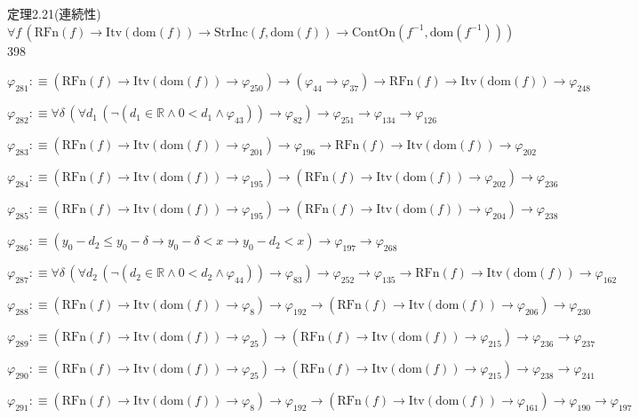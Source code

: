 \begin{fullproof}{定理2.21(連続性)}{$\forall f\,(\mathrm{RFn}(f) \to \mathrm{Itv}(\mathrm{dom}(f)) \to \mathrm{StrInc}(f,\mathrm{dom}(f)) \to \mathrm{ContOn}(f^{-1},\mathrm{dom}(f^{-1})))$}{398}
\begin{abbrevlist}
\item $\varphi_{281} :\equiv (\mathrm{RFn}(f) \to \mathrm{Itv}(\mathrm{dom}(f)) \to \varphi_{250}) \to (\varphi_{44} \to \varphi_{37}) \to \mathrm{RFn}(f) \to \mathrm{Itv}(\mathrm{dom}(f)) \to \varphi_{248}$
\item $\varphi_{282} :\equiv \forall \delta\,(\forall d_{1}\,(\neg (d_{1} \in \mathbb{R} \land 0 < d_{1} \land \varphi_{43})) \to \varphi_{82}) \to \varphi_{251} \to \varphi_{134} \to \varphi_{126}$
\item $\varphi_{283} :\equiv (\mathrm{RFn}(f) \to \mathrm{Itv}(\mathrm{dom}(f)) \to \varphi_{201}) \to \varphi_{196} \to \mathrm{RFn}(f) \to \mathrm{Itv}(\mathrm{dom}(f)) \to \varphi_{202}$
\item $\varphi_{284} :\equiv (\mathrm{RFn}(f) \to \mathrm{Itv}(\mathrm{dom}(f)) \to \varphi_{195}) \to (\mathrm{RFn}(f) \to \mathrm{Itv}(\mathrm{dom}(f)) \to \varphi_{202}) \to \varphi_{236}$
\item $\varphi_{285} :\equiv (\mathrm{RFn}(f) \to \mathrm{Itv}(\mathrm{dom}(f)) \to \varphi_{195}) \to (\mathrm{RFn}(f) \to \mathrm{Itv}(\mathrm{dom}(f)) \to \varphi_{204}) \to \varphi_{238}$
\item $\varphi_{286} :\equiv (y_{0} - d_{2} \leq y_{0} - \delta \to y_{0} - \delta < x \to y_{0} - d_{2} < x) \to \varphi_{197} \to \varphi_{268}$
\item $\varphi_{287} :\equiv \forall \delta\,(\forall d_{2}\,(\neg (d_{2} \in \mathbb{R} \land 0 < d_{2} \land \varphi_{44})) \to \varphi_{83}) \to \varphi_{252} \to \varphi_{135} \to \mathrm{RFn}(f) \to \mathrm{Itv}(\mathrm{dom}(f)) \to \varphi_{162}$
\item $\varphi_{288} :\equiv (\mathrm{RFn}(f) \to \mathrm{Itv}(\mathrm{dom}(f)) \to \varphi_{8}) \to \varphi_{192} \to (\mathrm{RFn}(f) \to \mathrm{Itv}(\mathrm{dom}(f)) \to \varphi_{206}) \to \varphi_{230}$
\item $\varphi_{289} :\equiv (\mathrm{RFn}(f) \to \mathrm{Itv}(\mathrm{dom}(f)) \to \varphi_{25}) \to (\mathrm{RFn}(f) \to \mathrm{Itv}(\mathrm{dom}(f)) \to \varphi_{215}) \to \varphi_{236} \to \varphi_{237}$
\item $\varphi_{290} :\equiv (\mathrm{RFn}(f) \to \mathrm{Itv}(\mathrm{dom}(f)) \to \varphi_{25}) \to (\mathrm{RFn}(f) \to \mathrm{Itv}(\mathrm{dom}(f)) \to \varphi_{215}) \to \varphi_{238} \to \varphi_{241}$
\item $\varphi_{291} :\equiv (\mathrm{RFn}(f) \to \mathrm{Itv}(\mathrm{dom}(f)) \to \varphi_{8}) \to \varphi_{192} \to (\mathrm{RFn}(f) \to \mathrm{Itv}(\mathrm{dom}(f)) \to \varphi_{161}) \to \varphi_{190} \to \varphi_{197}$

\end{abbrevlist}
\end{fullproof}
